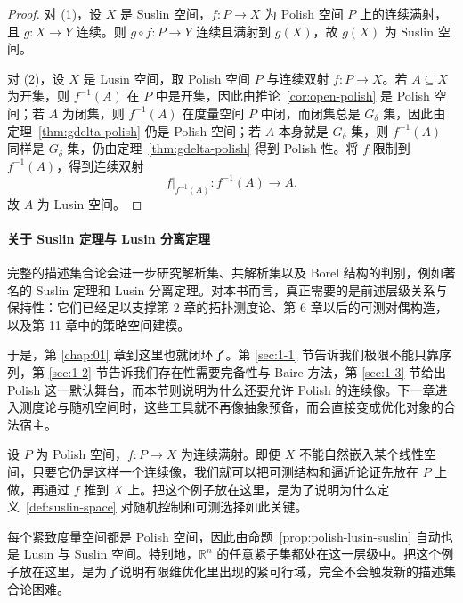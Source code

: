 \begin{proof}
对 (1)，设 $X$ 是 Suslin 空间，$f\colon P\to X$ 为 Polish 空间 $P$ 上的连续满射，且 $g\colon X\to Y$ 连续。则 $g\circ f\colon P\to Y$ 连续且满射到 $g(X)$，故 $g(X)$ 为 Suslin 空间。

对 (2)，设 $X$ 是 Lusin 空间，取 Polish 空间 $P$ 与连续双射 $f\colon P\to X$。若 $A\subseteq X$ 为开集，则 $f^{-1}(A)$ 在 $P$ 中是开集，因此由推论~\ref{cor:open-polish} 是 Polish 空间；若 $A$ 为闭集，则 $f^{-1}(A)$ 在度量空间 $P$ 中闭，而闭集总是 $G_\delta$ 集，因此由定理~\ref{thm:gdelta-polish} 仍是 Polish 空间；若 $A$ 本身就是 $G_\delta$ 集，则 $f^{-1}(A)$ 同样是 $G_\delta$ 集，仍由定理~\ref{thm:gdelta-polish} 得到 Polish 性。将 $f$ 限制到 $f^{-1}(A)$，得到连续双射
\[
f|_{f^{-1}(A)}\colon f^{-1}(A)\to A.
\]
故 $A$ 为 Lusin 空间。
\end{proof}

\paragraph{关于 Suslin 定理与 Lusin 分离定理}

\begin{remark}
完整的描述集合论会进一步研究解析集、共解析集以及 Borel 结构的判别，例如著名的 Suslin 定理和 Lusin 分离定理。对本书而言，真正需要的是前述层级关系与保持性：它们已经足以支撑第 2 章的拓扑测度论、第 6 章以后的可测对偶构造，以及第 11 章中的策略空间建模。
\end{remark}

于是，第 \ref{chap:01} 章到这里也就闭环了。第 \ref{sec:1-1} 节告诉我们极限不能只靠序列，第 \ref{sec:1-2} 节告诉我们存在性需要完备性与 Baire 方法，第 \ref{sec:1-3} 节给出 Polish 这一默认舞台，而本节则说明为什么还要允许 Polish 的连续像。下一章进入测度论与随机空间时，这些工具就不再像抽象预备，而会直接变成优化对象的合法宿主。

\begin{example}\label{ex:continuous-image-space}
设 $P$ 为 Polish 空间，$f\colon P\to X$ 为连续满射。即便 $X$ 不能自然嵌入某个线性空间，只要它仍是这样一个连续像，我们就可以把可测结构和逼近论证先放在 $P$ 上做，再通过 $f$ 推到 $X$ 上。把这个例子放在这里，是为了说明为什么定义~\ref{def:suslin-space} 对随机控制和可测选择如此关键。
\end{example}

\begin{example}\label{ex:compact-metric-lusin}
每个紧致度量空间都是 Polish 空间，因此由命题~\ref{prop:polish-lusin-suslin} 自动也是 Lusin 与 Suslin 空间。特别地，$\mathbb R^n$ 的任意紧子集都处在这一层级中。把这个例子放在这里，是为了说明有限维优化里出现的紧可行域，完全不会触发新的描述集合论困难。
\end{example}

